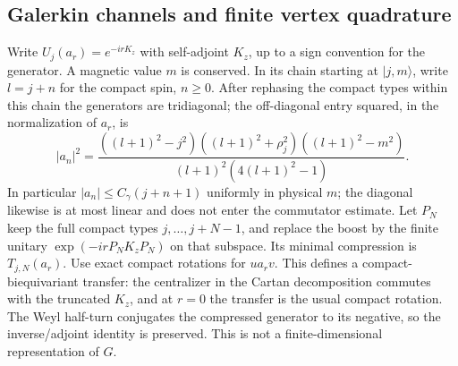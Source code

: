 \documentclass[11pt]{article}
\theoremstyle{remark}
\begin{document}
\subsection{Galerkin channels and finite vertex quadrature}

Write \(U_j(a_r)=e^{-irK_z}\) with self-adjoint \(K_z\), up to a sign convention for the generator. A magnetic value \(m\) is conserved. In its chain starting at \(|j,m\rangle\), write \(l=j+n\) for the compact spin, \(n\ge0\). After rephasing the compact types within this chain the generators are tridiagonal; the off-diagonal entry squared, in the normalization of \(a_r\), is \cite[App.~A]{Livine}
\begin{equation}\label{eq:a}
|a_n|^2=
\frac{((l+1)^2-j^2)((l+1)^2+\rho_j^2)((l+1)^2-m^2)}
     {(l+1)^2(4(l+1)^2-1)}.
\end{equation}
In particular \(|a_n|\le C_\gamma(j+n+1)\) uniformly in physical \(m\); the diagonal likewise is at most linear and does not enter the commutator estimate. Let \(P_N\) keep the full compact types \(j,\ldots,j+N-1\), and replace the boost by the finite unitary \(\exp(-irP_NK_zP_N)\) on that subspace. Its minimal compression is \(T_{j,N}(a_r)\). Use exact compact rotations for \(u a_r v\). This defines a compact-biequivariant transfer: the centralizer in the Cartan decomposition commutes with the truncated \(K_z\), and at \(r=0\) the transfer is the usual compact rotation. The Weyl half-turn conjugates the compressed generator to its negative, so the inverse/adjoint identity is preserved. This is not a finite-dimensional representation of \(G\).
\end{document}
